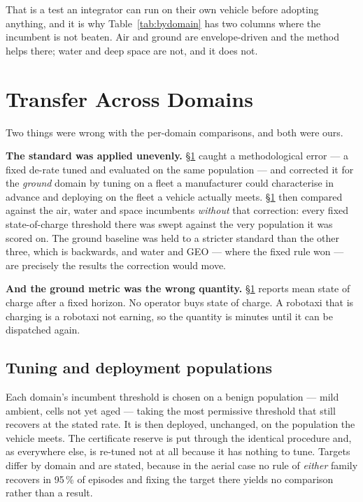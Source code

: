 \documentclass[11pt,letterpaper]{article}
\theoremstyle{definition}
\theoremstyle{remark}
\begin{document}
That is a test an integrator can run on their own vehicle before adopting anything, and it is why
Table~\ref{tab:bydomain} has two columns where the incumbent is not beaten. Air and ground are
envelope-driven and the method helps there; water and deep space are not, and it does not.


\section{Transfer Across Domains}\label{sec:transfer}

Two things were wrong with the per-domain comparisons, and both were ours.

\textbf{The standard was applied unevenly.} \S\ref{sec:transfer} caught a methodological error ---
a fixed de-rate tuned and evaluated on the same population --- and corrected it for the
\emph{ground} domain by tuning on a fleet a manufacturer could characterise in advance and
deploying on the fleet a vehicle actually meets. \S\ref{sec:transfer} then compared
against the air, water and space incumbents \emph{without} that correction: every fixed
state-of-charge threshold there was swept against the very population it was scored on. The
ground baseline was held to a stricter standard than the other three, which is backwards, and
water and GEO --- where the fixed rule won --- are precisely the results the correction would
move.

\textbf{And the ground metric was the wrong quantity.} \S\ref{sec:transfer} reports mean state of
charge after a fixed horizon. No operator buys state of charge. A robotaxi that is charging is a
robotaxi not earning, so the quantity is minutes until it can be dispatched again.

\subsection{Tuning and deployment populations}

Each domain's incumbent threshold is chosen on a benign population --- mild ambient, cells not
yet aged --- taking the most permissive threshold that still recovers at the stated rate. It is
then deployed, unchanged, on the population the vehicle meets. The certificate reserve is put
through the identical procedure and, as everywhere else, is re-tuned not at all because it has
nothing to tune. Targets differ by domain and are stated, because in the aerial case no rule of
\emph{either} family recovers in 95\,\% of episodes and fixing the target there yields no
comparison rather than a result.
\end{document}
